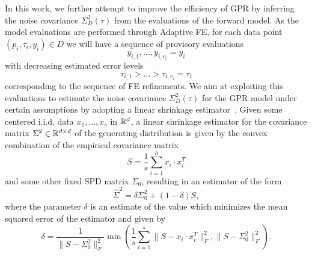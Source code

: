 In this work, we further attempt to improve the efficiency of GPR by inferring the noise covariance $\Sigma^2_D(\tau)$ from the evaluations of the forward model.\newline
As the model evaluations are performed through Adaptive FE, for each data point $(p_i, \tau_i, y_i) \in D$ we will have a sequence of provisory evaluations 
\begin{equation}\label{eq:eval-seq}
     y_{i,1}, \dots, y_{i,r_i} = y_i
\end{equation} 
    with decreasing estimated error levels 
\begin{equation} \label{eq:tol-seq}
        \tau_{i,1} > \dots > \tau_{i,r_i} = \tau_i
\end{equation}
 corresponding to the sequence of FE refinements.
We aim at exploiting this evaluations to estimate the noise covariance $\Sigma^2_D(\tau)$ for the GPR model under certain assumptions by adopting a linear shrinkage estimator~\cite{LedoitWolf2019}. \newline
{}
Given some centered i.i.d. data $x_1,\dots, x_s$ in $\mathbb{R}^d$, a linear shrinkage estimator for the covariance matrix $\Sigma^2 \in \mathbb{R}^{d\times d}$ of the generating distribution is given by the convex combination of the empirical covariance matrix \[
S = \frac{1}{s} \sum_{i=1}^h x_i \cdot x_i^T
\] 
and some other fixed SPD matrix $\Sigma_0$, resulting in an estimator of the form
\begin{equation}\label{eq:shrinkage-estimator-gen}
    \hat \Sigma^2 = \delta \Sigma^2_0 + (1-\delta) S,
\end{equation}
where the parameter $\delta$ is an estimate of the value which minimizes the mean squared error of the estimator and given by 
\begin{equation} \label{eq:shrinkage-delta}
    \delta = \frac{1}{\big \|S - \Sigma^2_0 \big \|_F^2} \min \left( \frac{1}{s} \sum_{i=1}^{s} \big \|S - x_i \cdot x_i^T\big \|_F^2, \big \|S - \Sigma^2_0 \big\|_F^2 \right).
\end{equation}\medbreak

